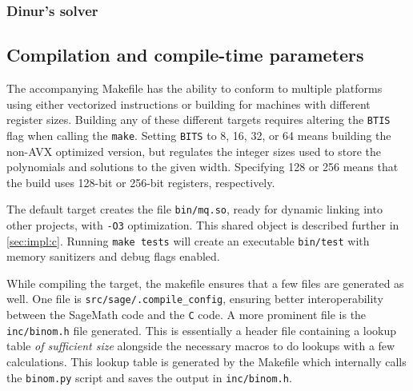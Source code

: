 \subsubsection{Dinur's solver}

\subsection{Compilation and compile-time parameters}
The accompanying Makefile has the ability to conform to multiple platforms using either vectorized instructions or building for machines with different register sizes. Building any of these different targets requires altering the \texttt{BTIS} flag when calling the \texttt{make}. Setting \texttt{BITS} to 8, 16, 32, or 64 means building the non-AVX optimized version, but regulates the integer sizes used to store the polynomials and solutions to the given width. Specifying 128 or 256 means that the build uses 128-bit or 256-bit registers, respectively. 

The default target creates the file \texttt{bin/mq.so}, ready for dynamic linking into other projects, with \texttt{-O3} optimization. This shared object is described further in \cref{sec:impl:c}. Running \texttt{make tests} will create an executable \texttt{bin/test} with memory sanitizers and debug flags enabled. 

While compiling the target, the makefile ensures that a few files are generated as well. One file is \texttt{src/sage/.compile\_config}, ensuring better interoperability between the SageMath code and the \texttt{C} code. A more prominent file is the \texttt{inc/binom.h} file generated. This is essentially a header file containing a lookup table \textit{of sufficient size} alongside the necessary macros to do lookups with a few calculations. This lookup table is generated by the Makefile which internally calls the \texttt{binom.py} script and saves the output in \texttt{inc/binom.h}.

\newpage